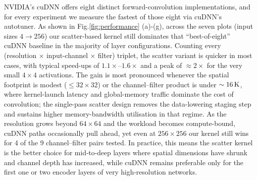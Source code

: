 NVIDIA's cuDNN offers eight distinct forward-convolution
implementations, and for every experiment we measure the fastest of
those eight via cuDNN's autotuner. As shown in Fig.\ref{fig:performance} (a)-(g),
across the seven plots (input sizes $4 \to 256$) our
scatter-based kernel still dominates that ``best-of-eight'' cuDNN
baseline in the majority of layer configurations. Counting every
(resolution $\times$ input-channel $\times$ filter) triplet, the scatter
variant is quicker in most cases, with typical speed-ups of
$1.1\times$--$1.6\times$ and a peak of $\approx 2\times$ for the very
small $4\times4$ activations. The gain is most pronounced whenever the
spatial footprint is modest ($\le 32\times32$) or the channel--filter
product is under $\sim16\text{\,K}$, where kernel-launch latency and
global-memory traffic dominate the cost of convolution; the single-pass
scatter design removes the data-lowering staging step and sustains
higher memory-bandwidth utilisation in that regime. As the resolution
grows beyond $64\times64$ and the workload becomes compute-bound,
cuDNN paths occasionally pull ahead, yet even at
$256\times256$ our kernel still wins for 4 of the 9 channel--filter
pairs tested. In practice, this means the scatter kernel is the better
choice for mid‑to‑deep layers where spatial dimensions have shrunk and channel depth has increased, while cuDNN
remains preferable only for the first one or two encoder layers of very
high-resolution networks.



